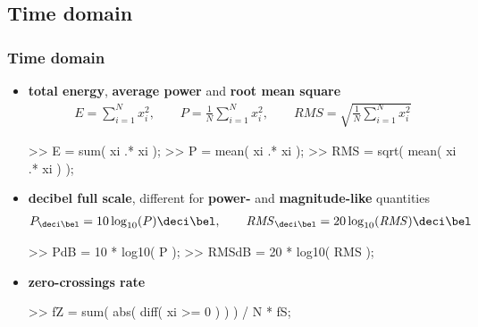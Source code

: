 
\subsection{Time domain}

\begin{frame}[fragile]
	\frametitle{Time domain}
	\begin{itemize}
		\item \textbf{total energy}, \textbf{average power} and \textbf{root mean square}
			\begin{align*}
				E=\sum_{i=1}^Nx_i^2,\qquad P=\frac1N\sum_{i=1}^Nx_i^2,\qquad\mathit{RMS}=\sqrt{\frac1N\sum_{i=1}^Nx_i^2}
			\end{align*}
			\begin{code}
>> E = sum( xi .* xi ); \color[medium]%
>> P = mean( xi .* xi ); \color[medium]%
>> RMS = sqrt( mean( xi .* xi ) ); \color[medium]%
			\end{code}
		\item \textbf{decibel full scale}, different for \textbf{power-} and \textbf{magnitude-like} quantities
			\begin{align*}
				P_{\deci\bel}=10\log_{10}(P)\deci\bel,\qquad\mathit{RMS}_{\deci\bel}=20\log_{10}(\mathit{RMS})\deci\bel
			\end{align*}
			\begin{code}
>> PdB = 10 * log10( P ); \color[medium]%
>> RMSdB = 20 * log10( RMS ); \color[medium]%
			\end{code}
		\item \textbf{zero-crossings rate}
			\begin{code}
>> fZ = sum( abs( diff( xi >= 0 ) ) ) / N * fS;
			\end{code}
	\end{itemize}
\end{frame}

